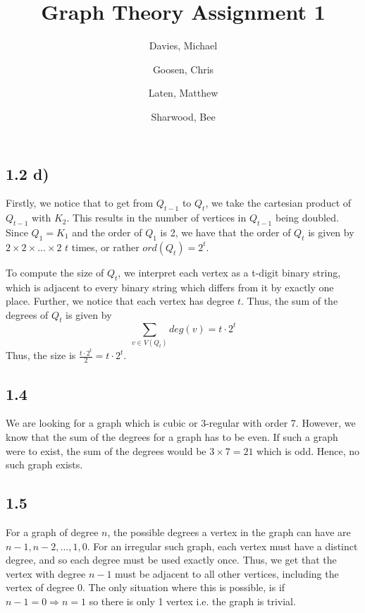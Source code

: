 \documentclass[a4paper]{article}
\begin{document}
\title{Graph Theory Assignment 1}
\author {
    Davies, Michael\\
    \and
    Goosen, Chris\\
    \and
    Laten, Matthew\\
    \and
    Sharwood, Bee\\
    \and
}
\maketitle

\subsection*{1.2 d)}
Firstly, we notice that to get from $Q_{t-1}$ to $Q_t$, we take the cartesian
product of $Q_{t-1}$ with $K_2$. This results in the number of vertices in
$Q_{t-1}$ being doubled. Since $Q_1 = K_1$ and the order of $Q_1$ is 2, we have
that the order of $Q_t$ is given by $2 \times 2 \times ... \times 2$ $t$ times,
or rather $ord(Q_t) = 2^t$.

To compute the size of $Q_t$, we interpret each vertex as a t-digit binary
string, which is adjacent to every binary string which differs from it by
exactly one place. Further, we notice that each vertex has degree $t$. Thus,
the sum of the degrees of $Q_t$ is given by
\begin{equation}
    \sum_{v \in V(Q_t)} deg(v) = t\cdot2^t
\end{equation}
Thus, the size is $\frac{t\cdot2^t}{2} = t\cdot2^t$.

\subsection*{1.4}
We are looking for a graph which is cubic or 3-regular with order 7. However,
we know that the sum of the degrees for a graph has to be even. If such a graph
were to exist, the sum of the degrees would be $3 \times 7 = 21$ which is odd. 
Hence, no such graph exists.

\subsection*{1.5}
For a graph of degree $n$, the possible degrees a vertex in the graph can have
are $n-1, n-2, ..., 1, 0$. For an irregular such graph, each vertex must have
a distinct degree, and so each degree must be used exactly once. Thus, we get that
the vertex with degree $n-1$ must be adjacent to all other vertices, including
the vertex of degree $0$. The only situation where this is possible, is if
$n-1 = 0 \Rightarrow n = 1$ so there is only 1 vertex i.e. the graph is trivial.
\end{document}
